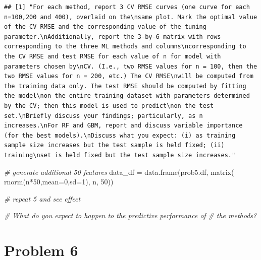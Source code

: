 \documentclass[
  11pt,
]{article}
\newenvironment{Shaded}{\begin{snugshade}}{\end{snugshade}}
\newcommand{\AttributeTok}[1]{\textcolor[rgb]{0.77,0.63,0.00}{#1}}
\newcommand{\CommentTok}[1]{\textcolor[rgb]{0.56,0.35,0.01}{\textit{#1}}}
\newcommand{\DecValTok}[1]{\textcolor[rgb]{0.00,0.00,0.81}{#1}}
\newcommand{\FunctionTok}[1]{\textcolor[rgb]{0.00,0.00,0.00}{#1}}
\newcommand{\NormalTok}[1]{#1}
\newcommand{\OtherTok}[1]{\textcolor[rgb]{0.56,0.35,0.01}{#1}}
\newcommand{\SpecialCharTok}[1]{\textcolor[rgb]{0.00,0.00,0.00}{#1}}
\begin{document}
\begin{verbatim}
## [1] "For each method, report 3 CV RMSE curves (one curve for each n=100,200 and 400), overlaid on the\nsame plot. Mark the optimal value of the CV RMSE and the corresponding value of the tuning parameter.\nAdditionally, report the 3-by-6 matrix with rows corresponding to the three ML methods and columns\ncorresponding to the CV RMSE and test RMSE for each value of n for model with parameters chosen by\nCV. (I.e., two RMSE values for n = 100, then the two RMSE values for n = 200, etc.) The CV RMSE\nwill be computed from the training data only. The test RMSE should be computed by fitting the model\non the entire training dataset with parameters determined by the CV; then this model is used to predict\non the test set.\nBriefly discuss your findings; particularly, as n increases.\nFor RF and GBM, report and discuss variable importance (for the best models).\nDiscuss what you expect: (i) as training sample size increases but the test sample is held fixed; (ii) training\nset is held fixed but the test sample size increases."
\end{verbatim}

\begin{Shaded}
\begin{Highlighting}[]
\CommentTok{\# generate additional 50 features}
\NormalTok{data\_df }\OtherTok{=} \FunctionTok{data.frame}\NormalTok{(prob5.df, }\FunctionTok{matrix}\NormalTok{( }\FunctionTok{rnorm}\NormalTok{(n}\SpecialCharTok{*}\DecValTok{50}\NormalTok{,}\AttributeTok{mean=}\DecValTok{0}\NormalTok{,}\AttributeTok{sd=}\DecValTok{1}\NormalTok{), n, }\DecValTok{50}\NormalTok{))}

\CommentTok{\# repeat 5 and see effect}

\CommentTok{\# What do you expect to happen to the predictive performance of }
\CommentTok{\# the methods?}
\end{Highlighting}
\end{Shaded}

\hypertarget{problem-6}{%
\section{Problem 6}\label{problem-6}}
\end{document}
